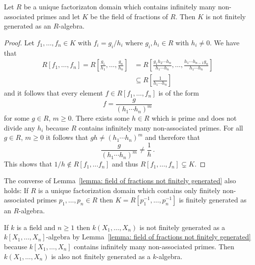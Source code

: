 \begin{lemma}
  \label{lemma: field of fractions not finitely generated}
  Let $R$ be a unique factorizaton domain which contains infinitely many non-associated primes and let $K$ be the field of fractions of $R$.
  Then $K$ is not finitely generated as an $R$-algebra.
\end{lemma}


\begin{proof}
  Let $f_1, \dotsc, f_n \in K$ with $f_i = g_i/h_i$ where $g_i, h_i \in R$ with $h_i \neq 0$.
  We have that
  \begin{align*}
                R[f_1, \dotsc, f_n]
     =          R\left[ \frac{g_1}{h_1}, \dotsc, \frac{g_n}{h_n} \right]
    &=          R\left[
                  \frac{g_1 h_2 \dotsm h_n}{h_1 \dotsm h_n},
                  \dotsc,
                  \frac{h_1 \dotsm h_{n-1} g_n}{h_1 \dotsm h_n}
                \right] \\
    &\subseteq  R\left[ \frac{1}{h_1 \dotsm h_n} \right]
  \end{align*}
  and it follows that every element $f \in R[f_1, \dotsc, f_n]$ is of the form
  \[
      f
    = \frac{g}{(h_1 \dotsm h_n)^m}
  \]
  for some $g \in R$, $m \geq 0$.
  There exists some $h \in R$ which is prime and does not divide any $h_i$ because $R$ contains infinitely many non-associated primes.
  For all $g \in R$, $m \geq 0$ it follows that $gh \neq (h_1 \dotsm h_n)^m$ and therefore that
  \[
    \frac{g}{(h_1 \dotsm h_n)^m} \neq \frac{1}{h} \,.
  \]
  This shows that $1/h \notin R[f_1, \dotsc f_n]$ and thus $R[f_1, \dotsc, f_n] \subsetneq K$.
\end{proof}


\begin{remark}
  The converse of Lemma~\ref{lemma: field of fractions not finitely generated} also holds:
  If $R$ is a unique factorization domain which contains only finitely non-associated primes $p_1, \dotsc, p_n \in R$ then $K = R[p_1^{-1}, \dotsc, p_n^{-1}]$ is finitely generated as an $R$-algebra.
\end{remark}


\begin{example}
  \label{example: rational functions finitely generated}
  If $k$ is a field and $n \geq 1$ then $k(X_1, \dotsc, X_n)$ is not finitely generated as a $k[X_1, \dotsc, X_n]$-algebra by Lemma~\ref{lemma: field of fractions not finitely generated} because $k[X_1, \dotsc, X_n]$ contains infinitely many non-associated primes.
  Then $k(X_1, \dotsc, X_n)$ is also not finitely generated as a $k$-algebra.
\end{example}


